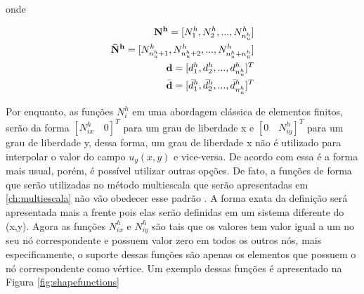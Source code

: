 onde 

\begin{eqnarray*}
\mathbf{N^h} = [N^h_1, N^h_2, ..., N^h_{n_u^h} ] \\
\mathbf{\bar{N}^h}  =[N^h_{n_u^h + 1}, N^h_{n_u^h + 2}, ..., N^h_{n_u^h + n_{\bar{u}}^h}] \\
\mathbf{d} = [d_1^h, d_2^h, ... , d_{n_u^h}^h]^T \\
\bar{\mathbf{d}} = [\bar{d}_1^h, \bar{d}_2^h, ... , \bar{d}_{n_{\bar{u}}^h}^h]^T
\end{eqnarray*}



Por enquanto, as funções $N^h_i$ em uma abordagem clássica de elementos finitos, serão da forma $[N^h_{ix} \quad 0]^T$ para um grau de liberdade x e  $[0 \quad N^h_{iy}]^T$  para um grau de liberdade y, dessa forma, um grau de liberdade x não é utilizado para interpolar o valor do campo $u_y(x, y)$ e vice-versa. De acordo com \cite{jacob} essa é a forma mais usual, porém, é possível utilizar outras opções. De fato, a funções de forma que serão utilizadas no método multiescala que serão apresentadas em \ref{ch:multiescala} não vão obedecer esse padrão . A forma exata da definição será apresentada mais a frente pois elas serão definidas em um sistema diferente do (x,y). Agora as funções $N^h_{ix}$ e $N^h_{iy}$ são tais que os valores tem valor igual a um no seu nó correspondente e possuem valor zero em todos os outros nós, mais especificamente, o suporte dessas funções são apenas os elementos que possuem o nó correspondente como vértice. Um exemplo dessas funções é apresentado na Figura \ref{fig:shapefunctions}

